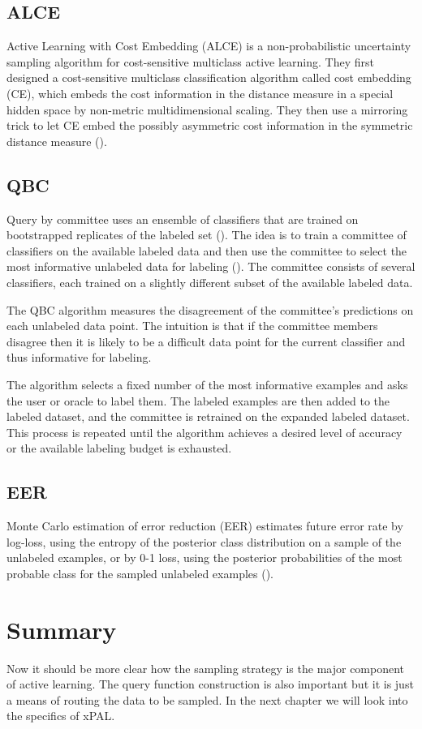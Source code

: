 \subsection{ALCE}
Active Learning with Cost Embedding (ALCE) is a non-probabilistic uncertainty sampling algorithm for cost-sensitive multiclass active learning. They first designed a cost-sensitive multiclass classification algorithm called cost embedding (CE), which embeds the cost information in the distance measure in a special hidden space by non-metric multidimensional scaling. They then use a mirroring trick to let CE embed the possibly asymmetric cost information in the symmetric distance measure (\cite{huang2016alce}).

\subsection{QBC}
Query by committee uses an ensemble of classifiers that are trained on bootstrapped replicates of the labeled set (\cite{seung1992qbc}). The idea is to train a committee of classifiers on the available labeled data and then use the committee to select the most informative unlabeled data for labeling (\cite{freund1997qbc}). The committee consists of several classifiers, each trained on a slightly different subset of the available labeled data.

The QBC algorithm measures the disagreement of the committee's predictions on each unlabeled data point. The intuition is that if the committee members disagree then it is likely to be a difficult data point for the current classifier and thus informative for labeling.

The algorithm selects a fixed number of the most informative examples and asks the user or oracle to label them. The labeled examples are then added to the labeled dataset, and the committee is retrained on the expanded labeled dataset. This process is repeated until the algorithm achieves a desired level of accuracy or the available labeling budget is exhausted.

\subsection{EER}
Monte Carlo estimation of error reduction (EER) estimates future error rate by log-loss, using the entropy of the posterior class distribution on a sample of the unlabeled examples, or by 0-1 loss, using the posterior probabilities of the most probable class for the sampled unlabeled examples (\cite{roy2001eer}).

\section{Summary}
Now it should be more clear how the sampling strategy is the major component of active learning. The query function construction is also important but it is just a means of routing the data to be sampled. In the next chapter we will look into the specifics of xPAL.
